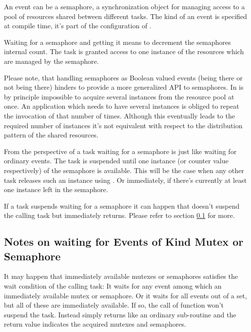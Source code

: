 An event can be a semaphore, a synchronization object for managing access
to a pool of resources shared between different tasks. The kind of an
event is specified at compile time, it's part of the configuration of
\rtos.

Waiting for a semaphore and getting it means to decrement the semaphores
internal count. The task is granted access to one instance of the
resources which are managed by the semaphore.

Please note, that handling semaphores as Boolean valued events (being
there or not being there) hinders to provide a more generalized
API to semaphores. In \rtos{} is by principle impossible to acquire several
instances from the resource pool at once. An application which needs to
have several instances is obliged to repeat the invocation of
 that number of times. Although this eventually
leads to the required number of instances it's not equivalent with respect
to the distribution pattern of the shared resources.

From the perspective of a task waiting for a semaphore is just like
waiting for ordinary events. The task is suspended until one instance (or
counter value respectively) of the semaphore is available. This will be
the case when any other task releases such an instance using
. Or immediately, if there's currently at least one
instance left in the semaphore.

If a task suspends waiting for a semaphore it can happen that
 doesn't suspend the calling task but
immediately returns. Please refer to section
\ref{secNoteOnWaitingForMutexes} for more.


\subsection{Notes on waiting for Events of Kind Mutex or Semaphore}
\label{secNoteOnWaitingForMutexes}

It may happen that immediately available mutexes or semaphores satisfies
the wait condition of the calling task: It waits for any event among which
an immediately available mutex or semaphore. Or it waits for all events
out of a set, but all of these are immediately available. If so, the call
of function  won't suspend the task. Instead
 simply returns like an ordinary sub-routine and
the return value indicates the acquired mutexes and semaphores.

